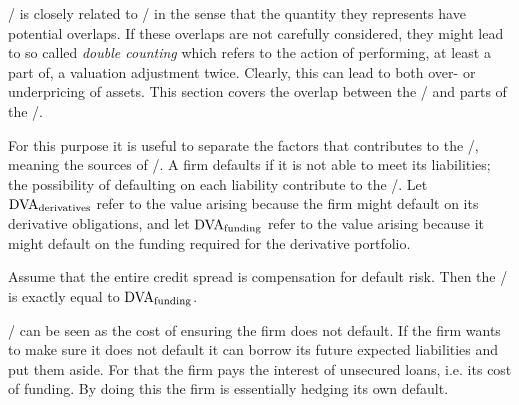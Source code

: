 \documentclass[main.tex]{subfiles}
\begin{document}
    \FVA/ is closely related to \DVA/ in the sense that the quantity they represents have potential overlaps.
    If these overlaps are not carefully considered, they might lead to so called \textit{double counting}
    which refers to the action of performing, at least a part of, a valuation adjustment twice. 
    Clearly, this can lead to both over- or underpricing of assets.
    This section covers the overlap between the \FVA/ and parts of the \DVA/.

    For this purpose it is useful to separate the factors that contributes to the \DVA/,
    meaning the sources of \DVA/. 
    A firm defaults if it is not able to meet its liabilities;
    the possibility of defaulting on each liability contribute to the \DVA/.
    Let $\DVA/_{\text{derivatives}}$ refer to the value arising
    because the firm might default on its derivative obligations,
    and let $\DVA/_{\text{funding}}$ refer to the value arising 
    because it might default on the funding required for the derivative portfolio.

    Assume that the entire credit spread is compensation for default risk.
    Then the \FBA/ is exactly equal to $\DVA/_{\text{funding}}$. 
    
    \DVA/ can be seen as the cost of ensuring the firm does not default.
    If the firm wants to make sure it does not default 
    it can borrow its future expected liabilities and put them aside.
    For that the firm pays the interest of unsecured loans, i.e. its cost of funding.
    By doing this the firm is essentially hedging its own default. 
\end{document}
